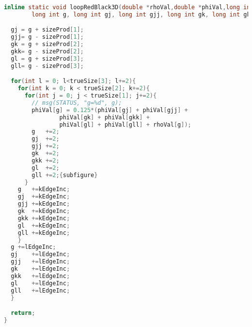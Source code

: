 \begin{lstlisting}[language=c, caption = loop routine]
  inline static void loopRedBlack3D(double *rhoVal,double *phiVal,long int *sizeProd, int *trueSize, int kEdgeInc, int lEdgeInc,
        long int g, long int gj, long int gjj, long int gk, long int gkk, long int gl, long int gll){

  gj = g + sizeProd[1];
  gjj= g - sizeProd[1];
  gk = g + sizeProd[2];
  gkk= g - sizeProd[2];
  gl = g + sizeProd[3];
  gll= g - sizeProd[3];

  for(int l = 0; l<trueSize[3]; l+=2){
    for(int k = 0; k < trueSize[2]; k+=2){
      for(int j = 0; j < trueSize[1]; j+=2){
        // msg(STATUS, "g=%d", g);
        phiVal[g] = 0.125*(phiVal[gj] + phiVal[gjj] +
                phiVal[gk] + phiVal[gkk] +
                phiVal[gl] + phiVal[gll] + rhoVal[g]);
        g	+=2;
        gj	+=2;
        gjj	+=2;
        gk	+=2;
        gkk	+=2;
        gl	+=2;
        gll	+=2;{subfigure}
      }
    g	+=kEdgeInc;
    gj	+=kEdgeInc;
    gjj	+=kEdgeInc;
    gk	+=kEdgeInc;
    gkk	+=kEdgeInc;
    gl	+=kEdgeInc;
    gll	+=kEdgeInc;
    }
  g	+=lEdgeInc;
  gj	+=lEdgeInc;
  gjj	+=lEdgeInc;
  gk	+=lEdgeInc;
  gkk	+=lEdgeInc;
  gl	+=lEdgeInc;
  gll	+=lEdgeInc;
  }

  return;
}
\end{lstlisting}
